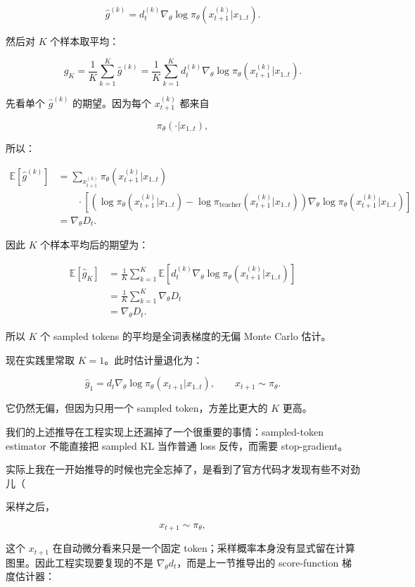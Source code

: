 \documentclass[11pt,a4paper,fontset=fandol]{ctexart}
\begin{document}
\[
\hat g^{(k)}
=
d_t^{(k)}
\nabla_\theta
\log\pi_\theta(x_{t+1}^{(k)}|x_{1..t}).
\]

然后对 \(K\) 个样本取平均：

\[
\boxed{
\hat g_K
=
\frac1K
\sum_{k=1}^{K}
\hat g^{(k)}
=
\frac1K
\sum_{k=1}^{K}
d_t^{(k)}
\nabla_\theta
\log\pi_\theta(x_{t+1}^{(k)}|x_{1..t}).
}
\]

先看单个 \(\hat g^{(k)}\) 的期望。因为每个 \(x_{t+1}^{(k)}\) 都来自

\[
\pi_\theta(\cdot|x_{1..t}),
\]

所以：

\[
\begin{aligned}
\mathbb E[\hat g^{(k)}]
&=
\sum_{x_{t+1}^{(k)}}
\pi_\theta(x_{t+1}^{(k)}|x_{1..t})\\
&\qquad\cdot
\left[
\left(
\log\pi_\theta(x_{t+1}^{(k)}|x_{1..t})
-
\log\pi_{\text{teacher}}(x_{t+1}^{(k)}|x_{1..t})
\right)
\nabla_\theta
\log\pi_\theta(x_{t+1}^{(k)}|x_{1..t})
\right]\\
&=
\nabla_\theta D_t.
\end{aligned}
\]

因此 \(K\) 个样本平均后的期望为：

\[
\begin{aligned}
\mathbb E[\hat g_K]
&=
\frac1K
\sum_{k=1}^{K}
\mathbb E
\left[
d_t^{(k)}
\nabla_\theta
\log\pi_\theta(x_{t+1}^{(k)}|x_{1..t})
\right]\\
&=
\frac1K
\sum_{k=1}^{K}
\nabla_\theta D_t\\
&=
\nabla_\theta D_t.
\end{aligned}
\]

所以 \(K\) 个 sampled tokens 的平均是全词表梯度的无偏 Monte Carlo 估计。

现在实践里常取 \(K=1\)。此时估计量退化为：

\[
\boxed{
\hat g_1
=
d_t
\nabla_\theta
\log\pi_\theta(x_{t+1}|x_{1..t}),
\qquad
x_{t+1}\sim\pi_\theta.
}
\]

它仍然无偏，但因为只用一个 sampled token，方差比更大的 \(K\) 更高。

我们的上述推导在工程实现上还漏掉了一个很重要的事情：sampled-token estimator 不能直接把 sampled KL 当作普通 loss 反传，而需要 stop-gradient。

实际上我在一开始推导的时候也完全忘掉了，是看到了官方代码才发现有些不对劲儿（

采样之后，

\[
x_{t+1}\sim\pi_\theta,
\]

这个 \(x_{t+1}\) 在自动微分看来只是一个固定 token；采样概率本身没有显式留在计算图里。因此工程实现要复现的不是 \(\nabla_\theta d_t\)，而是上一节推导出的 score-function 梯度估计器：
\end{document}
